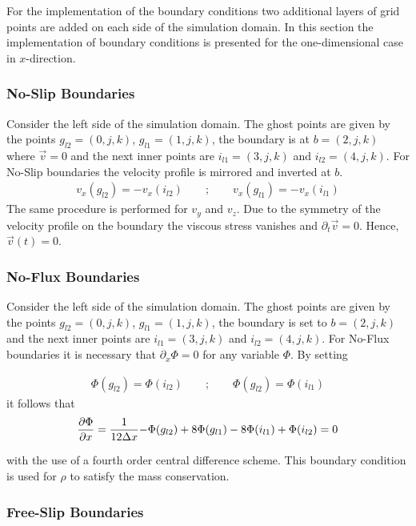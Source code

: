 For the implementation of the boundary conditions two additional layers of grid points are added on each side of the simulation domain.
In this section the implementation of boundary conditions is presented for the one-dimensional case in $x$-direction.

\subsubsection{No-Slip Boundaries}

Consider the left side of the simulation domain.
The ghost points are given by the points ${g_{l2}=(0, j, k)}$, ${g_{l1}=(1, j, k)}$,
the boundary is at ${b=(2, j, k)}$ where $\vec{v}=0$ and the next inner points are
$i_{l1}=(3, j, k)$ and $i_{l2}=(4, j, k)$.
For No-Slip boundaries the velocity profile is mirrored and inverted at $b$.
\begin{align}
    v_x(g_{l2}) = -v_x(i_{l2}) \qquad ; \qquad v_x(g_{l1}) = -v_x(i_{l1})
\end{align}
The same procedure is performed for $v_y$ and $v_z$.
Due to the symmetry of the velocity profile on the boundary the viscous stress vanishes and $\partial_t\vec{v} = 0$. Hence, $\vec{v}(t)=0$.


\subsubsection{No-Flux Boundaries}

Consider the left side of the simulation domain.
The ghost points are given by the points ${g_{l2}=(0, j, k)}$, ${g_{l1}=(1, j, k)}$,
the boundary is set to  ${b=(2, j, k)}$ and the next inner points are
$i_{l1}=(3, j, k)$ and $i_{l2}=(4, j, k)$.
For No-Flux boundaries it is necessary that $\partial_x\Phi = 0$ for any variable $\Phi$.
By setting

\begin{align}
    \Phi(g_{l2}) = \Phi(i_{l2})\qquad ; \qquad \Phi(g_{l2}) = \Phi(i_{l1})
\end{align}
it follows that
\begin{align}
    \pdn[\Phi]{x} = \frac{1}{12\Delta x}{-\Phi(g_{l2})+8\Phi(g_{l1}) -8\Phi(i_{l1}) + \Phi(i_{l2})} = 0
\end{align}

with the use of a fourth order central difference scheme.
This boundary condition is used for $\rho$ to satisfy the mass conservation.

\subsubsection{Free-Slip Boundaries}


